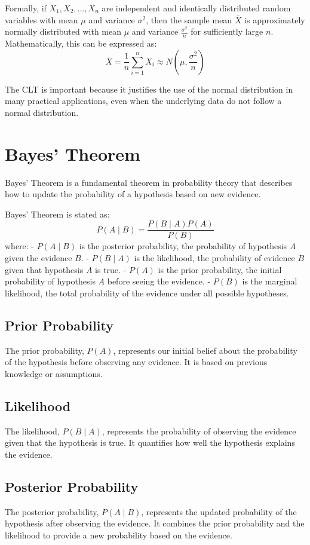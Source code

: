 \documentclass{article}
\begin{document}
Formally, if \(X_1, X_2, \ldots, X_n\) are independent and identically distributed random variables with mean \(\mu\) and variance \(\sigma^2\), then the sample mean \(\bar{X}\) is approximately normally distributed with mean \(\mu\) and variance \(\frac{\sigma^2}{n}\) for sufficiently large \(n\). Mathematically, this can be expressed as:
\[
\bar{X} = \frac{1}{n} \sum_{i=1}^{n} X_i \approx N\left(\mu, \frac{\sigma^2}{n}\right)
\]

The CLT is important because it justifies the use of the normal distribution in many practical applications, even when the underlying data do not follow a normal distribution.

\section{Bayes' Theorem}
Bayes' Theorem is a fundamental theorem in probability theory that describes how to update the probability of a hypothesis based on new evidence. 

Bayes' Theorem is stated as:
\[
P(A \mid B) = \frac{P(B \mid A) P(A)}{P(B)}
\]
where:
- \(P(A \mid B)\) is the posterior probability, the probability of hypothesis \(A\) given the evidence \(B\).
- \(P(B \mid A)\) is the likelihood, the probability of evidence \(B\) given that hypothesis \(A\) is true.
- \(P(A)\) is the prior probability, the initial probability of hypothesis \(A\) before seeing the evidence.
- \(P(B)\) is the marginal likelihood, the total probability of the evidence under all possible hypotheses.

\subsection{Prior Probability}
The prior probability, \(P(A)\), represents our initial belief about the probability of the hypothesis before observing any evidence. It is based on previous knowledge or assumptions.

\subsection{Likelihood}
The likelihood, \(P(B \mid A)\), represents the probability of observing the evidence given that the hypothesis is true. It quantifies how well the hypothesis explains the evidence.

\subsection{Posterior Probability}
The posterior probability, \(P(A \mid B)\), represents the updated probability of the hypothesis after observing the evidence. It combines the prior probability and the likelihood to provide a new probability based on the evidence.
\end{document}
